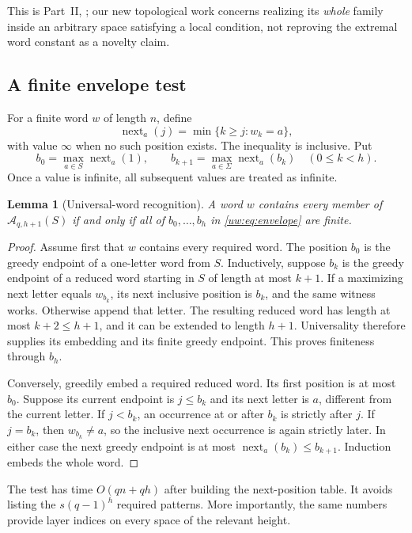 \documentclass[11pt,letterpaper]{article}
\numberwithin{equation}{section}
\newtheorem{lemma}[lemma]{Lemma}
\theoremstyle{definition}
\theoremstyle{remark}
\theoremstyle{definition}
\newcommand{\A}{\mathcal A}
\newcommand{\nextpos}{\operatorname{next}}
\begin{document}
This is Part~II, ; our new topological work concerns
realizing its \emph{whole} family inside an arbitrary space satisfying a
local condition, not reproving the extremal word constant as a novelty claim.

\subsection{A finite envelope test}
For a finite word $w$ of length $n$, define
\[
 \nextpos_a(j)=\min\{k\ge j:w_k=a\},
\]
with value $\infty$ when no such position exists. The inequality is inclusive.
Put
\begin{equation}\label{uw:eq:envelope}
 b_0=\max_{a\in S}\nextpos_a(1),\qquad
 b_{k+1}=\max_{a\in\Sigma}\nextpos_a(b_k)\quad(0\le k<h).
\end{equation}
Once a value is infinite, all subsequent values are treated as infinite.

\begin{lemma}[Universal-word recognition]\label{uw:lem:envelope}
A word $w$ contains every member of $\A_{q,h+1}(S)$ if and only if all of
$b_0,\ldots,b_h$ in \eqref{uw:eq:envelope} are finite.
\end{lemma}
\begin{proof}
Assume first that $w$ contains every required word. The position $b_0$ is the
greedy endpoint of a one-letter word from $S$. Inductively, suppose $b_k$ is
the greedy endpoint of a reduced word starting in $S$ of length at most
$k+1$. If a maximizing next letter equals $w_{b_k}$, its next inclusive
position is $b_k$, and the same witness works. Otherwise append that letter.
The resulting reduced word has length at most $k+2\le h+1$, and it can be
extended to length $h+1$. Universality therefore supplies its embedding and
its finite greedy endpoint. This proves finiteness through $b_h$.

Conversely, greedily embed a required reduced word. Its first position is at
most $b_0$. Suppose its current endpoint is $j\le b_k$ and its next letter
is $a$, different from the current letter. If $j<b_k$, an occurrence at or
after $b_k$ is strictly after $j$. If $j=b_k$, then $w_{b_k}\ne a$, so the
inclusive next occurrence is again strictly later. In either case the next
greedy endpoint is at most $\nextpos_a(b_k)\le b_{k+1}$. Induction embeds the
whole word.
\end{proof}

The test has time $O(qn+qh)$ after building the next-position table. It avoids
listing the $s(q-1)^h$ required patterns. More importantly, the same numbers
provide layer indices on every space of the relevant height.
\end{document}
